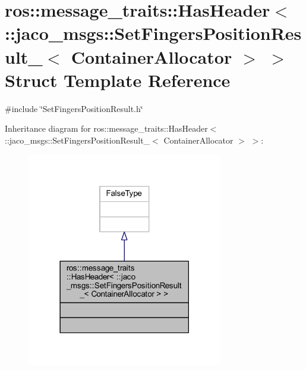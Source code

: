 \hypertarget{structros_1_1message__traits_1_1HasHeader_3_01_1_1jaco__msgs_1_1SetFingersPositionResult___3_01ContainerAllocator_01_4_01_4}{}\section{ros\+:\+:message\+\_\+traits\+:\+:Has\+Header$<$ \+:\+:jaco\+\_\+msgs\+:\+:Set\+Fingers\+Position\+Result\+\_\+$<$ Container\+Allocator $>$ $>$ Struct Template Reference}
\label{structros_1_1message__traits_1_1HasHeader_3_01_1_1jaco__msgs_1_1SetFingersPositionResult___3_01ContainerAllocator_01_4_01_4}


{\ttfamily \#include \char`\"{}Set\+Fingers\+Position\+Result.\+h\char`\"{}}



Inheritance diagram for ros\+:\+:message\+\_\+traits\+:\+:Has\+Header$<$ \+:\+:jaco\+\_\+msgs\+:\+:Set\+Fingers\+Position\+Result\+\_\+$<$ Container\+Allocator $>$ $>$\+:
\nopagebreak
\begin{figure}[H]
\begin{center}
\leavevmode
\includegraphics[width=242pt]{d9/df5/structros_1_1message__traits_1_1HasHeader_3_01_1_1jaco__msgs_1_1SetFingersPositionResult___3_01C539b23afa4e84aceeff458602a75eb4c}
\end{center}
\end{figure}


